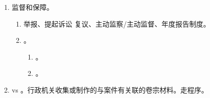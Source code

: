 \begin{enumerate}
\begin{enumerate}
\begin{enumerate}
\begin{enumerate}
                          \item 邮寄 \yjt 签收。。
                          \item 电子方式、平信邮寄 \yjt 双方确认。
                        \end{enumerate}
                  \item 答复方式。\yi 可以提要求。\er 你要的形式，政府能做到就尽量满足你。
                  \item 收费问题。
                        \begin{enumerate}
                          \item 原则不收钱。。
                          \item 申请量大、超过处理范围可收信息处理费。 页，40/页。
                        \end{enumerate}
                  \item 涉密不是不提供，。
                  \item 缺材料一次性告知（材料补正告知书），7 个工作日内补。
                  \item 不公开告知 + 说明理由。可诉。
                \end{enumerate}
          \item 申请和主动公开的转化。多人多次。。
          \item 防止申请人滥用权利。数量频次超过合理范围；主观目的非法；要求加工、汇总、整理。
          \item 信息更证。有权则更正，无权则告知找别的有权主体。
        \end{enumerate}
  \item 监督和保障。
        \begin{enumerate}
          \item 举报、提起诉讼 \hz 复议、主动监察/主动监督、年度报告制度。
          \item {}。
                \begin{enumerate}
                  \item {}。
                  \item {}。
                \end{enumerate}
        \end{enumerate}
  \item vs 。行政机关收集或制作的与案件有关联的卷宗材料。走程序。
\end{enumerate}

